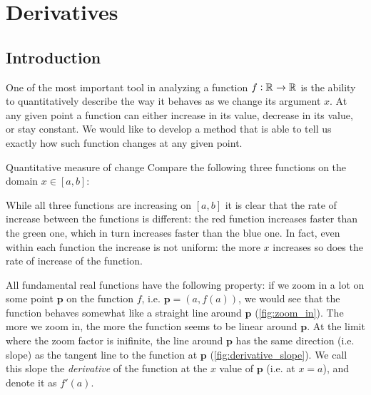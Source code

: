 \section{Derivatives}
\label{sec:derivatives}

\subsection{Introduction}
\label{sub:introduction}

One of the most important tool in analyzing a function $f:\mathbb{R}^{}\to\mathbb{R}^{}$ is the ability to quantitatively describe the way it behaves as we change its argument $x$. At any given point a function can either increase in its value, decrease in its value, or stay constant. We would like to develop a method that is able to tell us exactly how such function changes at any given point.

\begin{example}{Quantitative measure of change}{}
  Compare the following three functions on the domain $x\in[a,b]$:

  \centering

  \flushleft
  While all three functions are increasing on $[a,b]$ it is clear that the rate of increase between the functions is different: the red function increases faster than the green one, which in turn increases faster than the blue one. In fact, even within each function the increase is not uniform: the more $x$ increases so does the rate of increase of the function.
\end{example}

All fundamental real functions have the following property: if we zoom in a lot on some point $\bm{p}$ on the function $f$, i.e. $\bm{p}=\left(a,f\left(a\right)\right)$, we would see that the function behaves somewhat like a straight line around $\bm{p}$ (\autoref{fig:zoom_in}). The more we zoom in, the more the function seems to be linear around $\bm{p}$. At the limit where the zoom factor is inifinite, the line around $\bm{p}$ has the same direction (i.e. slope) as the tangent line to the function at $\bm{p}$ (\autoref{fig:derivative_slope}). We call this slope the \emph{derivative} of the function at the $x$ value of $\bm{p}$ (i.e. at $x=a$), and denote it as $f'(a)$.

